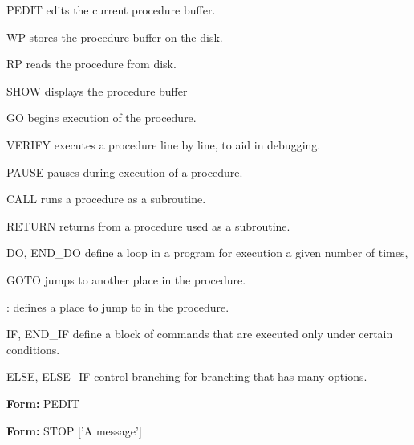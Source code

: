 {\newpage\clearpage
{}%
\begin{example}
  \item[PEDIT\hfill]{edits the current procedure buffer.}
  \item[WP\hfill]{stores the procedure buffer on the disk.}
  \item[RP\hfill]{reads the procedure from disk.}
  \item[SHOW\hfill]{displays the procedure buffer}
  \item[GO\hfill]{begins execution of the procedure.}
\end{example}%
\lthtmlfigureZ
\lthtmlcheckvsize\clearpage}

{\newpage\clearpage
{}%
\begin{example}
  \item[VERIFY\hfill]{executes a procedure line by line, to aid in debugging.}
  \item[PAUSE\hfill]{pauses during execution of a procedure.}
  \item[CALL\hfill]{runs a procedure as a subroutine.}
  \item[RETURN\hfill]{returns from a procedure used as a subroutine.}
  \item[DO, END\_DO\hfill]{define a loop in a program for execution a given
       number of times,}
  \item[GOTO\hfill]{jumps to another place in the procedure.}
  \item[:\hfill]{defines a place to jump to in the procedure.}
  \item[IF, END\_IF \hfill]{define a block of commands that are executed
       only under certain conditions.}
  \item[ELSE, ELSE\_IF\hfill]{control branching for branching that has many
       options.}
\end{example}%
\lthtmlfigureZ
\lthtmlcheckvsize\clearpage}

{\newpage\clearpage
{}%
\begin{command}
  \item[\textbf{Form: } PEDIT\hfill]{}
\end{command}%
\lthtmlfigureZ
\lthtmlcheckvsize\clearpage}

{\newpage\clearpage
{}%
\begin{command}
  \item[\textbf{Form: } STOP {['A message']}\hfill]{}
\end{command}%
\lthtmlfigureZ
\lthtmlcheckvsize\clearpage}

